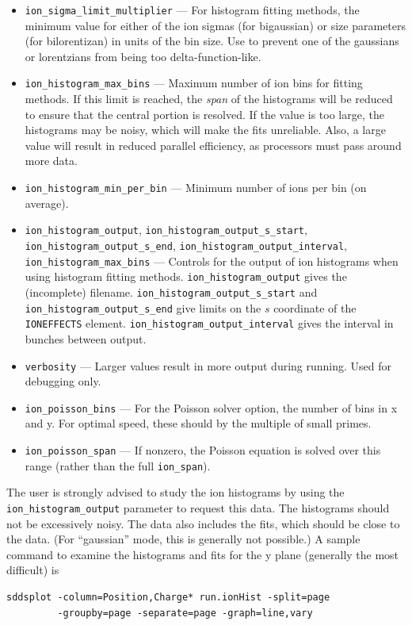 \documentclass[11pt]{article}
\begin{document}
\begin{itemize}
  $m$ to get the range used.
\item \verb|ion_sigma_limit_multiplier| --- For  histogram fitting methods,
  the minimum value for either of the ion sigmas (for bigaussian) or size parameters (for bilorentizan)
  in units of the bin size. Use to prevent one of the gaussians or lorentzians from being too delta-function-like.
\item \verb|ion_histogram_max_bins| --- Maximum number of ion bins for fitting methods.
  If this limit is reached, the {\em span} of the histograms will  be reduced to ensure that the central portion is
  resolved.
  If the value is  too large, the histograms may
  be noisy, which will make the fits unreliable. Also, a large value will result in reduced parallel efficiency, as
  processors must pass around more data. 
\item \verb|ion_histogram_min_per_bin| --- Minimum number of ions per bin (on average).
\item \verb|ion_histogram_output|, \verb|ion_histogram_output_s_start|, \verb|ion_histogram_output_s_end|, 
      \verb|ion_histogram_output_interval|, \verb|ion_histogram_max_bins| --- Controls for the output of ion histograms when
      using histogram fitting methods.
      \verb|ion_histogram_output| gives the (incomplete) filename.
      \verb|ion_histogram_output_s_start| and \verb|ion_histogram_output_s_end| give limits on the $s$ coordinate of the
      \verb|IONEFFECTS| element. \verb|ion_histogram_output_interval| gives the interval in bunches between output.
    \item \verb|verbosity| --- Larger values result in more output during running. Used for debugging only.
    \item \verb|ion_poisson_bins| --- For the Poisson solver option, the number of bins in x and y.  For optimal speed, these should by the multiple of small primes.
      \item \verb|ion_poisson_span| --- If nonzero, the Poisson equation is solved over this range (rather than the full \verb|ion_span|). 
      
\end{itemize}

The user is strongly advised to study the ion histograms by using the \verb|ion_histogram_output| parameter to request
this data.
The histograms should not be excessively noisy.
The data also includes the fits, which should be close to the data.
(For ``gaussian'' mode, this is generally not possible.)
A sample command to examine the histograms and fits for the y plane (generally the most difficult) is
\begin{verbatim}
sddsplot -column=Position,Charge* run.ionHist -split=page 
         -groupby=page -separate=page -graph=line,vary 
\end{verbatim}
\end{document}
